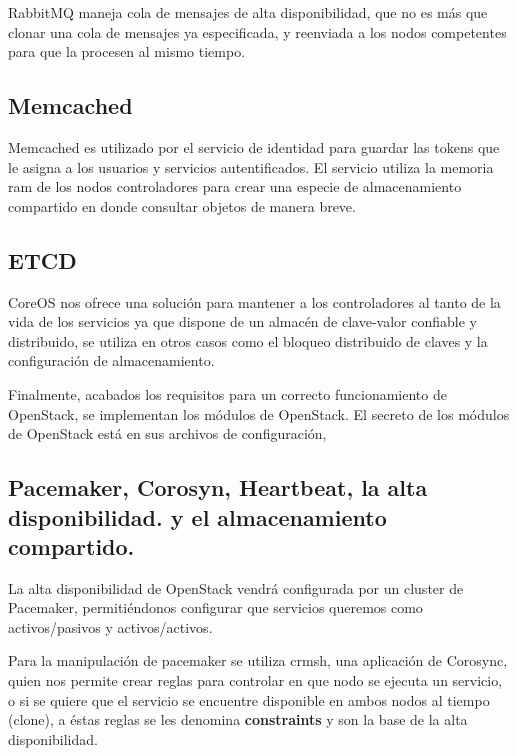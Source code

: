     
    RabbitMQ maneja cola de mensajes de alta disponibilidad, que no es más que clonar una cola de mensajes ya especificada, y reenviada a los nodos competentes para que la procesen al mismo tiempo.
    
    \subsection{Memcached}
    
    Memcached es utilizado por el servicio de identidad para guardar las tokens que le asigna a los usuarios y servicios autentificados. El servicio utiliza la memoria ram de los nodos controladores para crear una especie de almacenamiento compartido en donde consultar objetos de manera breve.
    
    \subsection{ETCD}
    
    CoreOS nos ofrece una solución para mantener a los controladores al tanto de la vida de los servicios ya que dispone de un almacén de clave-valor confiable y distribuido, se utiliza en otros casos como el bloqueo distribuido de claves y la configuración de almacenamiento.
    
    Finalmente, acabados los requisitos para un correcto funcionamiento de OpenStack, se implementan los módulos de OpenStack. El secreto de los módulos de OpenStack está en sus archivos de configuración,
    
    
    \subsection{Pacemaker, Corosyn, Heartbeat, la alta disponibilidad. y el almacenamiento compartido.}
    
    La alta disponibilidad de OpenStack vendrá configurada por un cluster de Pacemaker, permitiéndonos configurar que servicios queremos como activos/pasivos y activos/activos. 
    
    
    Para la manipulación de pacemaker se utiliza crmsh, una aplicación de Corosync, quien nos permite crear reglas para controlar en que nodo se ejecuta un servicio, o si se quiere que el servicio se encuentre disponible en ambos nodos al tiempo (clone), a éstas reglas se les denomina \textbf{constraints} y son la base de la alta disponibilidad.
    
